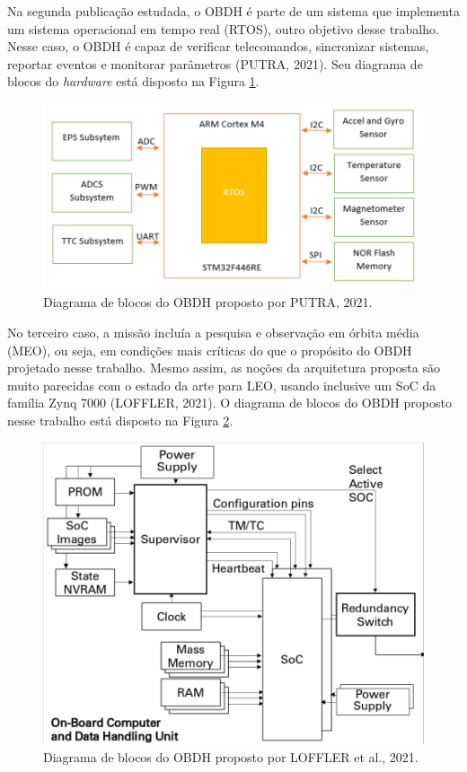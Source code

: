 Na segunda publicação estudada, o OBDH é parte de um sistema que implementa um sistema operacional em tempo real (RTOS), outro objetivo desse trabalho. Nesse caso, o OBDH é capaz de verificar telecomandos, sincronizar sistemas, reportar eventos e monitorar parâmetros (PUTRA, 2021). Seu diagrama de blocos do \textit{hardware} está disposto na Figura \ref{fig:putra}.

\begin{figure}[H]
    \centering
    \includegraphics[scale=0.8]{images/putra.png}
    \caption{Diagrama de blocos do OBDH proposto por PUTRA, 2021.}
    \label{fig:putra}
\end{figure}

No terceiro caso, a missão incluía a pesquisa e observação em órbita média (MEO), ou seja, em condições mais críticas do que o propósito do OBDH projetado nesse trabalho. Mesmo assim, as noções da arquitetura proposta são muito parecidas com o estado da arte para LEO, usando inclusive um SoC da família Zynq 7000 (LOFFLER, 2021). O diagrama de blocos do OBDH proposto nesse trabalho está disposto na Figura \ref{fig:loffler}.

\begin{figure}[H]
    \centering
    \includegraphics[scale=0.8]{images/loffler.png}
    \caption{Diagrama de blocos do OBDH proposto por LOFFLER et al., 2021.}
    \label{fig:loffler}
\end{figure}

